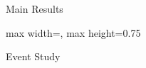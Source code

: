 \begin{frame}{Main Results}
\begin{adjustbox}{max width=\textwidth, max height=0.75\textheight}
% 
\end{adjustbox}
\end{frame}

\begin{frame}{Event Study}
\end{frame}
